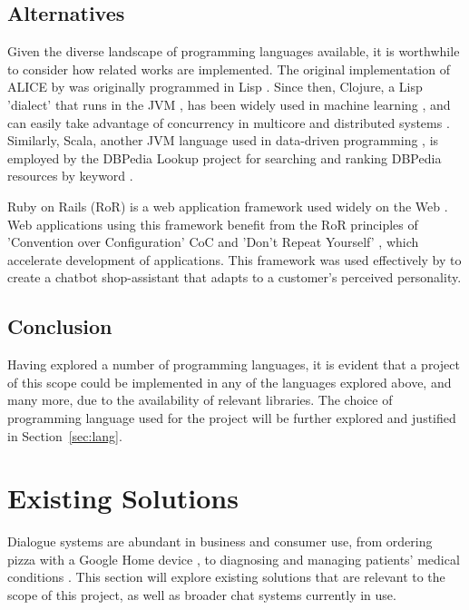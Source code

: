 \subsection{Alternatives}
Given the diverse landscape of programming languages available, it is worthwhile to consider how related works are implemented. The original implementation of ALICE by \citet{wallace2009anatomy} was originally programmed in Lisp \cite{winston1986lisp}. Since then, Clojure, a Lisp 'dialect' that runs in the JVM \cite{hickey2008clojure}, has been widely used in machine learning \cite{wali2014clojure}, and can easily take advantage of concurrency in multicore and distributed systems \cite{emerick2012clojure}. Similarly, Scala, another JVM language used in data-driven programming \cite{wampler2014programming}, is employed by the DBPedia Lookup project for searching and ranking DBPedia resources by keyword \cite{dbpedialookup}.

Ruby on Rails (RoR) is a web application framework used widely on the Web \cite{paplauskaite2016}. Web applications using this framework benefit from the RoR principles of 'Convention over Configuration' CoC and 'Don't Repeat Yourself' \cite{bachle2007ruby}, which accelerate development of applications. This framework was used effectively by \citet{horzyk2009intelligent} to create a chatbot shop-assistant that adapts to a customer's perceived personality.

\subsection{Conclusion}
Having explored a number of programming languages, it is evident that a project of this scope could be implemented in any of the languages explored above, and many more, due to the availability of relevant libraries. The choice of programming language used for the project will be further explored and justified in Section~\ref{sec:lang}.

\cleardoublepage
\section{Existing Solutions}
\label{sec:existing}
Dialogue systems are abundant in business and consumer use, from ordering pizza with a Google Home device \cite{google2018dominos}, to diagnosing and managing patients’ medical conditions \cite{yourmd2017}. This section will explore existing solutions that are relevant to the scope of this project, as well as broader chat systems currently in use.

